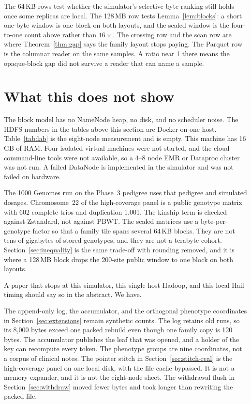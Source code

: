 \documentclass[11pt]{article}
\begin{document}
The 64\,KB rows test whether the simulator's selective byte ranking still holds once some replicas are local.
The 128\,MB row tests Lemma~\ref{lem:blocks}: a short one-byte window is one block on both layouts, and the scaled window is the four-to-one count above rather than \(16\times\).
The crossing row and the scan row are where Theorem~\ref{thm:gap} says the family layout stops paying.
The Parquet row is the columnar reader on the same samples.
A ratio near 1 there means the opaque-block gap did not survive a reader that can name a sample.

\section{What this does not show}
\label{sec:limits}

The block model has no NameNode heap, no disk, and no scheduler noise.
The HDFS numbers in the tables above this section are Docker on one host.
Table~\ref{tab:lab} is the eight-node measurement and is empty.
This machine has 16\,GB of RAM.
Four isolated virtual machines were not started, and the cloud command-line tools were not available, so a 4--8 node EMR or Dataproc cluster was not run.
A failed DataNode is implemented in the simulator and was not failed on hardware.

The 1000 Genomes run on the Phase~3 pedigree uses that pedigree and simulated dosages.
Chromosome~22 of the high-coverage panel is a public genotype matrix with 602 complete trios and duplication 1.001.
The kinship term is checked against Zstandard, not against PBWT.
The scaled matrices use a byte-per-genotype factor so that a family tile spans several 64\,KB blocks.
They are not tens of gigabytes of stored genotypes, and they are not a terabyte cohort.
Section~\ref{sec:inequality} is the same trade-off with rounding removed, and it is where a 128\,MB block drops the 200-site public window to one block on both layouts.

A paper that stops at this simulator, this single-host Hadoop, and this local Hail timing should say so in the abstract.
We have.

The append-only log, the accumulator, and the orthogonal phenotype coordinates in Section~\ref{sec:extensions} remain synthetic counts.
The log retains old runs, so its 8{,}000 bytes exceed one packed rebuild even though one family copy is 120 bytes.
The accumulator publishes the leaf that was opened, and a holder of the key can recompute every token.
The phenotype groups are nine coordinates, not a corpus of clinical notes.
The pointer stitch in Section~\ref{sec:stitch-real} is the high-coverage panel on one local disk, with the file cache bypassed.
It is not a memory expander, and it is not the eight-node sheet.
The withdrawal flush in Section~\ref{sec:withdraw} moved fewer bytes and took longer than rewriting the packed file.
\end{document}
